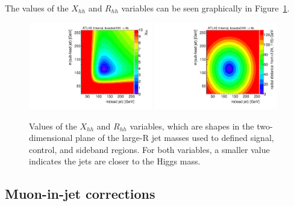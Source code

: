 \paragraph{}
The values of the $X_{hh}$ and $R_{hh}$ variables can be seen graphically in Figure~\ref{fig:boosted-regiondef-cartoons}.
\begin{figure}[htbp!]
\begin{center}
  \includegraphics[angle=270, width=0.48\textwidth]{./figures/boosted/Other/cartoon-xhh.pdf}
  \includegraphics[angle=270, width=0.48\textwidth]{./figures/boosted/Other/cartoon-rhh.pdf}
  \caption{Values of the $X_{hh}$ and $R_{hh}$ variables, which are shapes in the two-dimensional plane of the large-R jet masses used to defined signal, control, and sideband regions. For both variables, a smaller value indicates the jets are closer to the Higgs mass. }
  \label{fig:boosted-regiondef-cartoons}
\end{center}
\end{figure}

\subsection{Muon-in-jet corrections}

